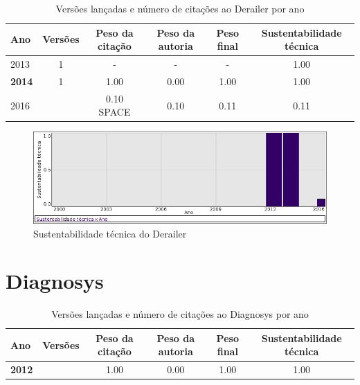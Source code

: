 \begin{table}[H]
\caption{Versões lançadas e número de citações ao Derailer por ano}
\centering
\begin{tabular}{| l | c | c | c | c | c |}
  \hline
  Ano & Versões & Peso da citação & Peso da autoria & Peso final & Sustentabilidade técnica \\
  \hline
        2013 & 1 & - & - & -
        &
          {\color{blue} 1.00}
        \\
\hline
            {\bf 2014}
          &
          1
          &
          1.00
          &
          0.00
          &
          1.00
          &
            {\color{blue} 1.00}
          \\
\hline
            2016
          &
          
          &
          0.10
            {\tiny SPACE}
          &
          0.10
          &
          0.11
          &
            {\color{red} 0.11}
          \\
\hline
\end{tabular}
\end{table}

\begin{figure}[h]
  \center
  \includegraphics[scale=0.50]{imagens/softwares-charts/derailer.png}
  \caption{Sustentabilidade técnica do Derailer}
\end{figure}


\section{Diagnosys}


\begin{table}[H]
\caption{Versões lançadas e número de citações ao Diagnosys por ano}
\centering
\begin{tabular}{| l | c | c | c | c | c |}
  \hline
  Ano & Versões & Peso da citação & Peso da autoria & Peso final & Sustentabilidade técnica \\
  \hline
            {\bf 2012}
          &
          
          &
          1.00
          &
          0.00
          &
          1.00
          &
            {\color{blue} 1.00}
          \\
\hline
\end{tabular}
\end{table}

